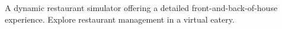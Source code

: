A dynamic restaurant simulator offering a detailed front-\/and-\/back-\/of-\/house experience. Explore restaurant management in a virtual eatery. 